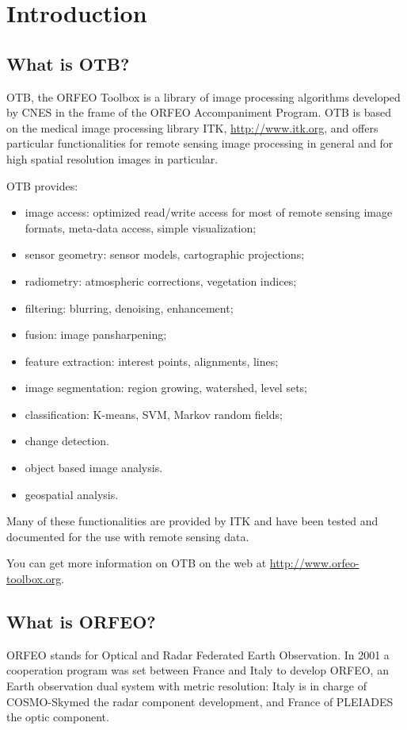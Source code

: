 \section{Introduction}
\subsection{What is OTB?}
OTB, the ORFEO Toolbox is a library of image processing algorithms developed by CNES in the
frame of the ORFEO Accompaniment Program.
OTB is based on the medical image processing library ITK, \url{http://www.itk.org}, and offers
particular functionalities for remote sensing image processing in
general and for high spatial resolution images in particular.

OTB provides:
\begin{itemize}
\item image access: optimized read/write access for most of remote sensing
image formats, meta-data access, simple visualization;
\item sensor geometry: sensor models, cartographic projections;
\item radiometry: atmospheric corrections, vegetation indices;
\item filtering: blurring, denoising, enhancement;
\item fusion: image pansharpening;
\item feature extraction: interest points, alignments, lines;
\item image segmentation: region growing, watershed, level sets;
\item classification: K-means, SVM, Markov random fields;
\item change detection.
\item object based image analysis.
\item geospatial analysis.
\end{itemize}

Many of these functionalities are provided by ITK and have been tested
and documented for the use with remote sensing data.

You can get more information on OTB on the web at \url{http://www.orfeo-toolbox.org}.

\subsection{What is ORFEO?}
ORFEO stands for Optical and Radar Federated Earth Observation.  In
2001 a cooperation program was set between France and Italy to develop
ORFEO, an Earth observation dual system with metric resolution: Italy
is in charge of COSMO-Skymed the radar component development, and
France of PLEIADES the optic component.

